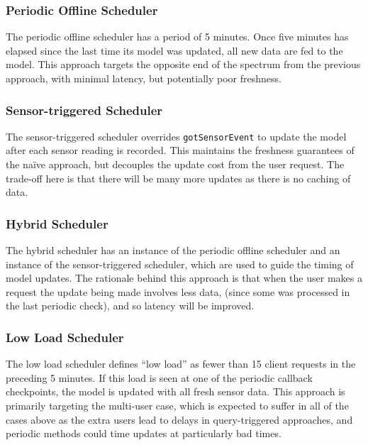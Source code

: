 \documentclass[a4paper]{acm_proc_article-sp}
\makeatletter
\newcommand{\naive}{na\"{i}ve\@\xspace}
\makeatother
\begin{document}
\subsubsection{Periodic Offline Scheduler}

The periodic offline scheduler has a period of 5 minutes.  Once five minutes has elapsed since the last time its model was updated, all new data are fed to the model.  This approach targets the opposite end of the spectrum from the previous approach, with minimal latency, but potentially poor freshness.

\subsubsection{Sensor-triggered Scheduler}

The sensor-triggered scheduler overrides \lstinline|gotSensorEvent| to update the model after each sensor reading is recorded.  This maintains the freshness guarantees of the \naive approach, but decouples the update cost from the user request.  The trade-off here is that there will be many more updates as there is no caching of data.

\subsubsection{Hybrid Scheduler}

The hybrid scheduler has an instance of the periodic offline scheduler and an instance of the sensor-triggered scheduler, which are used to guide the timing of model updates.  The rationale behind this approach is that when the user makes a request the update being made involves less data, (since some was processed in the last periodic check), and so latency will be improved.

\subsubsection{Low Load Scheduler}

The low load scheduler defines ``low load'' as fewer than 15 client requests in the preceding 5 minutes.  If this load is seen at one of the periodic callback checkpoints, the model is updated with all fresh sensor data.  This approach is primarily targeting the multi-user case, which is expected to suffer in all of the cases above as the extra users lead to delays in query-triggered approaches, and periodic methods could time updates at particularly bad times.
\end{document}
